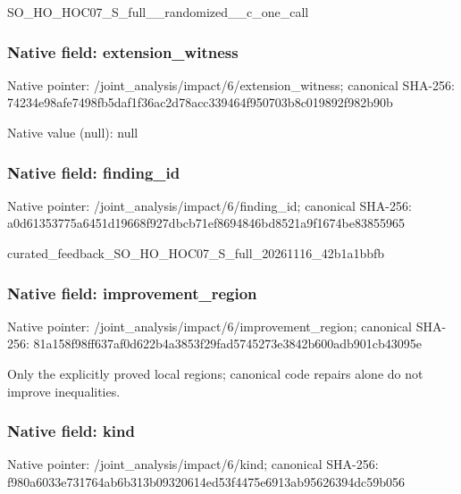 \documentclass[10pt,a4paper]{article}
\begin{document}
\begingroup\raggedright\sloppy SO\_\allowbreak{}HO\_\allowbreak{}HOC07\_\allowbreak{}S\_\allowbreak{}full\_\allowbreak{}\_\allowbreak{}randomized\_\allowbreak{}\_\allowbreak{}c\_\allowbreak{}one\_\allowbreak{}call\par\endgroup

\subsubsection{Native field: extension\_\allowbreak{}witness}
Native pointer: /joint\_\allowbreak{}analysis/impact/6/extension\_\allowbreak{}witness; canonical SHA-256: 74234e98afe7498fb5daf1f36ac2d78acc339464f950703b8c019892f982b90b

Native value (null): null

\subsubsection{Native field: finding\_\allowbreak{}id}
Native pointer: /joint\_\allowbreak{}analysis/impact/6/finding\_\allowbreak{}id; canonical SHA-256: a0d61353775a6451d19668f927dbcb71ef8694846bd8521a9f1674be83855965

\begingroup\raggedright\sloppy curated\_\allowbreak{}feedback\_\allowbreak{}SO\_\allowbreak{}HO\_\allowbreak{}HOC07\_\allowbreak{}S\_\allowbreak{}full\_\allowbreak{}20261116\_\allowbreak{}42b1a1bbfb\par\endgroup

\subsubsection{Native field: improvement\_\allowbreak{}region}
Native pointer: /joint\_\allowbreak{}analysis/impact/6/improvement\_\allowbreak{}region; canonical SHA-256: 81a158f98ff637af0d622b4a3853f29fad5745273e3842b600adb901cb43095e

\begingroup\raggedright\sloppy Only the explicitly proved local regions;\allowbreak{} canonical code repairs alone do not improve inequalities.\par\endgroup

\subsubsection{Native field: kind}
Native pointer: /joint\_\allowbreak{}analysis/impact/6/kind; canonical SHA-256: f980a6033e731764ab6b313b09320614ed53f4475e6913ab95626394dc59b056
\end{document}
